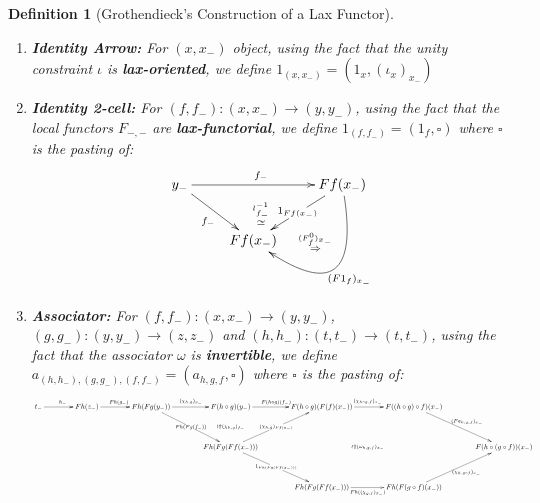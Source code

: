 \documentclass{article}
\numberwithin{equation}{section}
\theoremstyle{definition}
\theoremstyle{plain}
\newtheorem{definition}[equation]{Definition}
\begin{document}
\begin{definition}[Grothendieck's Construction of a Lax Functor]
\begin{enumerate}[label = $\bullet$]
		\[\xymatrix@C=7em@R=4em{
			z_- \ar@{}[drr]|(0.3){\overset{\beta_-}{\Rightarrow}} \ar[r]^{g_-} \ar[dr]_{g^{\prime}_-} & Fg(y_-) \ar@{}[dr]|{\overset{(F\beta)_{f_-}}{\simeq}} \ar[d]|{(F\beta)_{y_-}} \ar[r]^{Fg(f_-)} & Fg(Ff(x_-)) \ar[d]|{(F\beta)_{Ff(x_-)}} \ar@{}[ddr]|{\overset{(\chi_{\beta,\alpha})_{x_-}}{\Rightarrow}} \ar[r]^{(\chi_{g,f})_{x_-}} & F(g\circ f)(x_-) \ar[dd]|{(F(\beta\star \alpha))_{x_-}}\\
			& Fg^{\prime}(y_-) \ar@{}[drr]|(0.3){\overset{\alpha_-}{\Rightarrow}} \ar[r]^{Fg^{\prime}(f_-)} \ar[dr]_{Fg^{\prime}(f^{\prime}_-)} & Fg^{\prime}(Ff(x_-)) \ar[d]|{Fg^{\prime}((F\beta)_{x_-})}\\
			&& Fg^{\prime}(Ff^{\prime}(x_-)) \ar[r]^{(\chi_{g^{\prime},f^{\prime}})_{x_-}} & F(g^{\prime}\circ f^{\prime})(x_-)
		}\]
		\item \textbf{Identity Arrow:} For $(x,x_-)$ object, using the fact that the unity constraint $\iota$ is \textbf{lax-oriented}, we define $1_{(x,x_-)} = (1_x, (\iota_x)_{x_-})$
		\item \textbf{Identity 2-cell:} For $(f,f_-):(x, x_-) \to (y, y_-)$, using the fact that the local functors $F_{-,-}$ are \textbf{lax-functorial}, we define $1_{(f,f_-)} = (1_f, \square)$ where $\square$ is the pasting of:
		\[\xymatrix{
			y_- \ar[dr]_{f_-} \ar[rr]^{f_-} \ar@{}[drr]|{\overset{l^{-1}_{f_-}}{\simeq}} && Ff(x_-) \ar[dl]|{1_{Ff(x_-)}} \ar@{{}{ }{}}@/^2pc/[dl]|{\overset{(F^0_{f})_{x_-}}{\Rightarrow}} \ar@/^4pc/[dl]^{(F1_f)_{x_-}}\\
			& Ff(x_-)&
		}\]
		\item \textbf{Associator:} For $(f,f_-):(x, x_-) \to (y, y_-)$, $(g,g_-):(y, y_-) \to (z, z_-)$ and $(h,h_-):(t, t_-) \to (t, t_-)$, using the fact that the associator $\omega$ is \textbf{invertible}, we define $a_{(h,h_-), (g,g_-), (f,f_-)} = (a_{h,g,f}, \square)$ where $\square$ is the pasting of:
		\[\resizebox{6in}{!}{\xymatrix@C=4em@R=4em{
				t_- \ar[r]^{h_-} & Fh(z_-) \ar[r]^{Fh(g_-)} & Fh(Fg(y_-)) \ar[dr]|{Fh(Fg(f_-))} \ar[r]^{(\chi_{h,g})_{y_-}} & F(h\circ g)(y_-) \ar@{}[d]|{\wr\Uparrow(\chi_{h,g})_{f_-}} \ar[r]^{F(h\circ g)(f_-)} & F(h \circ g)(F(f)(x_-)) \ar@{}[ddr]|{\wr\Uparrow (\omega_{h,g,f})_{x_-}} \ar[r]^{(\chi_{h\circ g,f})_{x_-}} & F((h\circ g) \circ f)(x_-) \ar[dr]^{(Fa_{h,g,f})_{x_-}}\\
				&&& Fh(Fg(Ff(x_-))) \ar[ur]|{(\chi_{h,g})_{Ff(x_-)}} \ar[dr]|{1_{Fh(Fg(Ff(x_-)))}} &&& F(h\circ (g \circ f))(x_-)\\
				&&&& Fh(Fg(Ff(x_-))) \ar[r]_{Fh((\chi_{g,f})_{x_-})} & Fh(F(g\circ f)(x_-)) \ar[ur]_{(\chi_{h,g\circ f})_{x_-}} &
}}\]
\end{enumerate}
\end{definition}
\end{document}
